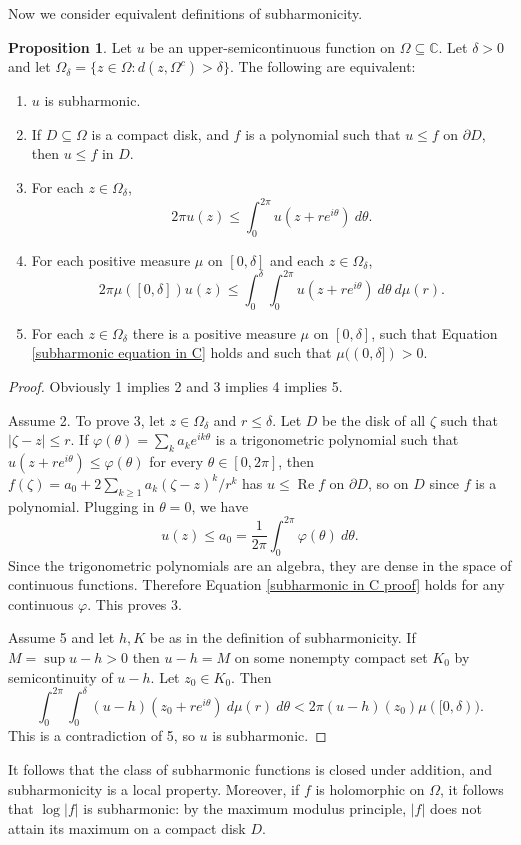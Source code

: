 \documentclass[12pt]{report}
\newcommand{\CC}{\mathbb{C}}
\renewcommand{\Re}{\operatorname{Re}}
\theoremstyle{definition}
\newtheorem{proposition}[theorem]{Proposition}
\begin{document}
Now we consider equivalent definitions of subharmonicity.
\begin{proposition}
Let $u$ be an upper-semicontinuous function on $\Omega \subseteq \CC$. Let $\delta > 0$ and let $\Omega_\delta = \{z \in \Omega: d(z, \Omega^c) > \delta\}$. The following are equivalent:
\begin{enumerate}
    \item $u$ is subharmonic.
    \item If $D \subseteq \Omega$ is a compact disk, and $f$ is a polynomial such that $u \leq f$ on $\partial D$, then $u \leq f$ in $D$.
    \item For each $z \in \Omega_\delta$,
    $$2\pi u(z) \leq \int_0^{2\pi} u(z+re^{i\theta}) ~d\theta.$$
    \item For each positive measure $\mu$ on $[0, \delta]$ and each $z \in \Omega_\delta$,
    \begin{equation}
        \label{subharmonic equation in C}
        2\pi \mu([0, \delta]) u(z) \leq \int_0^\delta \int_0^{2\pi} u(z + re^{i\theta}) ~d\theta ~d\mu(r).
    \end{equation}
    \item For each $z \in \Omega_\delta$ there is a positive measure $\mu$ on $[0, \delta]$, such that Equation \ref{subharmonic equation in C} holds and such that $\mu((0, \delta]) > 0$.
\end{enumerate}
\end{proposition}
\begin{proof}
    Obviously 1 implies 2 and 3 implies 4 implies 5.
    
    Assume 2. To prove 3, let $z \in \Omega_\delta$ and $r \leq \delta$. Let $D$ be the disk of all $\zeta$ such that $|\zeta - z| \leq r$. If $\varphi(\theta) = \sum_k a_k e^{ik\theta}$ is a trigonometric polynomial such that $u(z + re^{i\theta}) \leq \varphi(\theta)$ for every $\theta \in [0, 2\pi]$, then $f(\zeta) = a_0 + 2\sum_{k\geq 1} a_k(\zeta - z)^k/r^k$ has $u \leq \Re f$ on $\partial D$, so on $D$ since $f$ is a polynomial. Plugging in $\theta = 0$, we have
\begin{equation}
    \label{subharmonic in C proof}
    u(z) \leq a_0 = \frac{1}{2\pi} \int_0^{2\pi} \varphi(\theta) ~d\theta.
\end{equation}
    Since the trigonometric polynomials are an algebra, they are dense in the space of continuous functions. Therefore Equation \ref{subharmonic in C proof} holds for any continuous $\varphi$. This proves 3.
    
    Assume 5 and let $h, K$ be as in the definition of subharmonicity. If $M = \sup u - h > 0$ then $u - h = M$ on some nonempty compact set $K_0$ by semicontinuity of $u - h$. Let $z_0 \in K_0$. Then
    $$\int_0^{2\pi} \int_0^\delta (u-h)(z_0 + re^{i\theta}) ~d\mu(r) ~d\theta < 2\pi (u-h)(z_0) \mu([0, \delta)).$$
    This is a contradiction of 5, so $u$ is subharmonic.
\end{proof}
    It follows that the class of subharmonic functions is closed under addition, and subharmonicity is a local property. Moreover, if $f$ is holomorphic on $\Omega$, it follows that $\log|f|$ is subharmonic: by the maximum modulus principle, $|f|$ does not attain its maximum on a compact disk $D$.
\end{document}
